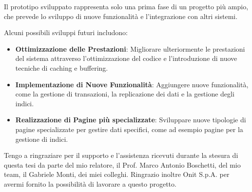\documentclass[12pt,a4paper,openright,twoside]{book}
\begin{document}
        Il prototipo sviluppato rappresenta solo una prima fase di un progetto più ampio, che prevede lo sviluppo di nuove funzionalità e l'integrazione con altri sistemi.

        Alcuni possibili sviluppi futuri includono:

        \begin{itemize}
            \item \textbf{Ottimizzazione delle Prestazioni}: Migliorare ulteriormente le prestazioni del sistema attraverso l'ottimizzazione del codice e l'introduzione di nuove tecniche di caching e buffering.
            \item \textbf{Implementazione di Nuove Funzionalità}: Aggiungere nuove funzionalità, come la gestione di transazioni, la replicazione dei dati e la gestione degli indici.
            \item \textbf{Realizzazione di Pagine più specializzate}: Sviluppare nuove tipologie di pagine specializzate per gestire dati specifici, come ad esempio pagine per la gestione di indici.
        \end{itemize}


\backmatter

\nocite{*} %




\begin{acknowledgements}
    Tengo a ringraziare per il supporto e l'assistenza ricevuti durante la stesura di questa tesi da parte del mio relatore, il Prof. Marco Antonio Boschetti, del mio team, il Gabriele Monti, dei miei colleghi.
    Ringrazio inoltre Onit S.p.A. per avermi fornito la possibilità di lavorare a questo progetto.
\end{acknowledgements}
\end{document}
